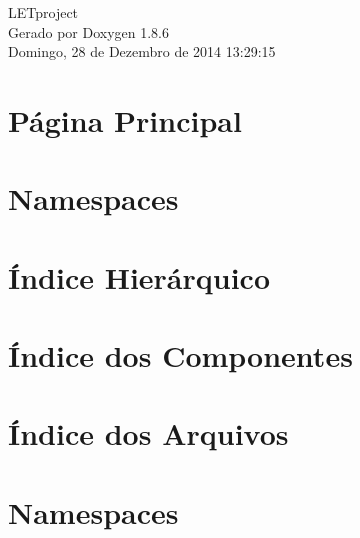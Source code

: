 \documentclass[twoside]{article}
\begin{document}
\hypersetup{pageanchor=false}
\begin{titlepage}
\vspace*{7cm}
\begin{center}%
{\Large L\-E\-Tproject }\\
\vspace*{1cm}
{\large Gerado por Doxygen 1.8.6}\\
\vspace*{0.5cm}
{\small Domingo, 28 de Dezembro de 2014 13:29:15}\\
\end{center}
\end{titlepage}
\tableofcontents
{}
\hypersetup{pageanchor=true}

\section{Página Principal}
\label{index}\hypertarget{index}{}
\section{Namespaces}

\section{Índice Hierárquico}

\section{Índice dos Componentes}

\section{Índice dos Arquivos}

\section{Namespaces}





























\end{document}
